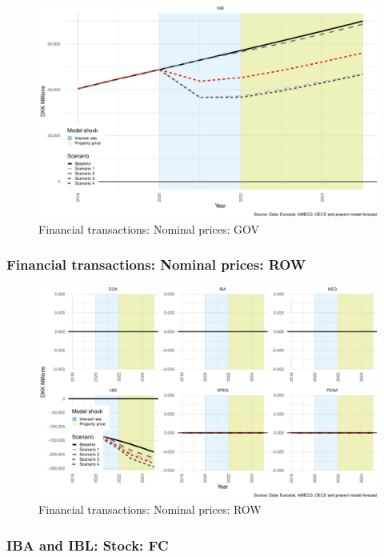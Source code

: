\documentclass[
]{book}
\begin{document}
\begin{figure}
\centering
\includegraphics{figures/fl-fi-sfc-plot-fin-tr-GOV-1.pdf}
\caption{\label{fig:fl-fi-sfc-plot-fin-tr-GOV}Financial transactions: Nominal prices: GOV}
\end{figure}

\hypertarget{financial-transactions-nominal-prices-row}{%
\subsubsection{Financial transactions: Nominal prices: ROW}\label{financial-transactions-nominal-prices-row}}

\begin{figure}
\centering
\includegraphics{figures/fl-fi-sfc-plot-fin-tr-ROW-1.pdf}
\caption{\label{fig:fl-fi-sfc-plot-fin-tr-ROW}Financial transactions: Nominal prices: ROW}
\end{figure}

\hypertarget{iba-and-ibl-stock-fc}{%
\subsubsection{IBA and IBL: Stock: FC}\label{iba-and-ibl-stock-fc}}
\end{document}

